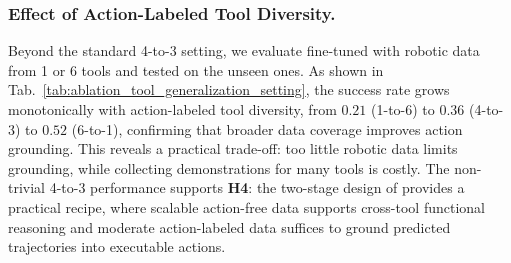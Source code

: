 
\subsubsection{Effect of Action-Labeled Tool Diversity.}
Beyond the standard 4-to-3 setting, we evaluate \algoname{} fine-tuned with robotic data from 1 or 6 tools and tested on the unseen ones. As shown in Tab.~\ref{tab:ablation_tool_generalization_setting}, the success rate grows monotonically with action-labeled tool diversity, from $0.21$ (1-to-6) to $0.36$ (4-to-3) to $0.52$ (6-to-1), confirming that broader data coverage improves action grounding. This reveals a practical trade-off: too little robotic data limits grounding, while collecting demonstrations for many tools is costly. The non-trivial 4-to-3 performance supports \textbf{H4}: the two-stage design of \algoname{} provides a practical recipe, where scalable action-free data supports cross-tool functional reasoning and moderate action-labeled data suffices to ground predicted trajectories into executable actions.




